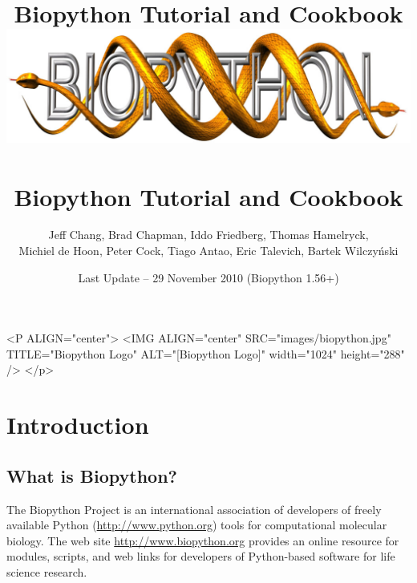 \documentclass{report}
\begin{document}
\begin{htmlonly}
\title{Biopython Tutorial and Cookbook}
\end{htmlonly}
\begin{latexonly}
\title{
\includegraphics[width=\textwidth]{images/biopython.jpg}\\
~\\
Biopython Tutorial and Cookbook}
\end{latexonly}

\author{Jeff Chang, Brad Chapman, Iddo Friedberg, Thomas Hamelryck, \\
Michiel de Hoon, Peter Cock, Tiago Antao, Eric Talevich, Bartek Wilczy\'{n}ski}
\date{Last Update -- 29 November 2010 (Biopython 1.56+)}

\begin{rawhtml}
<P ALIGN="center">
<IMG ALIGN="center" SRC="images/biopython.jpg" TITLE="Biopython Logo" ALT="[Biopython Logo]" width="1024" height="288" />
</p>
\end{rawhtml}

\maketitle
\tableofcontents

\chapter{Introduction}
\label{chapter:introduction}

\section{What is Biopython?}

The Biopython Project is an international association of developers of freely available Python (\url{http://www.python.org}) tools for computational molecular biology. The web site \url{http://www.biopython.org} provides an online resource for modules, scripts, and web links for developers of Python-based software for life science research.
\end{document}
